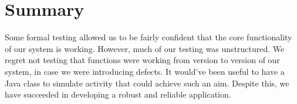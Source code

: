 \section{Summary}

Some formal testing allowed us to be fairly confident that the core functionality of our system is working. However, much of our testing was unstructured. We regret not testing that functions were working from version to version of our system, in case we were introducing defects. It would've been useful to have a Java class to simulate activity that could achieve such an aim. Despite this, we have succeeded in developing a robust and reliable application.  

